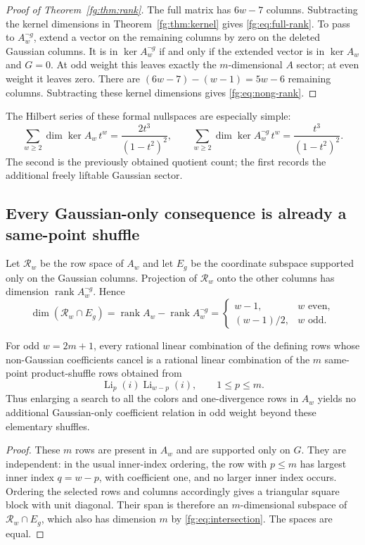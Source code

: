 \begin{proof}[Proof of Theorem~\ref{fg:thm:rank}]
The full matrix has $6w-7$ columns. Subtracting the kernel dimensions
in Theorem~\ref{fg:thm:kernel} gives
\eqref{fg:eq:full-rank}. To pass to $A_w^{\neg g}$, extend a vector
on the remaining columns by zero on the deleted Gaussian columns.
It is in $\ker A_w^{\neg g}$ if and only if the extended vector is
in $\ker A_w$ and $G=0$. At odd weight this leaves exactly the
$m$-dimensional $A$ sector; at even weight it leaves zero. There
are $(6w-7)-(w-1)=5w-6$ remaining columns. Subtracting these
kernel dimensions gives \eqref{fg:eq:nong-rank}.
\end{proof}

The Hilbert series of these formal nullspaces are especially simple:
\[
 \sum_{w\ge2}\dim\ker A_w\,t^w
 =\frac{2t^3}{(1-t^2)^2},\qquad
 \sum_{w\ge2}\dim\ker A_w^{\neg g}\,t^w
 =\frac{t^3}{(1-t^2)^2}.
\]
The second is the previously obtained quotient count; the first records
the additional freely liftable Gaussian sector.

\subsection{Every Gaussian-only consequence is already a same-point shuffle}

Let $\mathcal R_w$ be the row space of $A_w$ and let $E_g$ be the
coordinate subspace supported only on the Gaussian columns.
Projection of $\mathcal R_w$ onto the other columns has dimension
$\operatorname{rank}A_w^{\neg g}$. Hence
\begin{equation}\label{fg:eq:intersection}
 \dim(\mathcal R_w\cap E_g)
 =\operatorname{rank}A_w-\operatorname{rank}A_w^{\neg g}
 =\begin{cases}
    w-1,&w\text{ even},\\
    (w-1)/2,&w\text{ odd}.
  \end{cases}
\end{equation}

\begin{corollary}
\label{fg:cor:g-only}
For odd $w=2m+1$, every rational linear combination of the defining
rows whose non-Gaussian coefficients cancel is a rational linear
combination of the $m$ same-point product-shuffle rows obtained from
\[
 \operatorname{Li}_p(i)\operatorname{Li}_{w-p}(i),
 \qquad 1\le p\le m.
\]
Thus enlarging a search to all the colors and one-divergence rows in
$A_w$ yields no additional Gaussian-only coefficient relation in
odd weight beyond these elementary shuffles.
\end{corollary}
\begin{proof}
These $m$ rows are present in $A_w$ and are supported only on $G$.
They are independent: in the usual inner-index ordering, the row
with $p\le m$ has largest inner index $q=w-p$, with coefficient
one, and no larger inner index occurs. Ordering the selected rows
and columns accordingly gives a triangular square block with unit
diagonal. Their span is therefore an $m$-dimensional subspace of
$\mathcal R_w\cap E_g$, which also has dimension $m$ by
\eqref{fg:eq:intersection}. The spaces are equal.
\end{proof}

